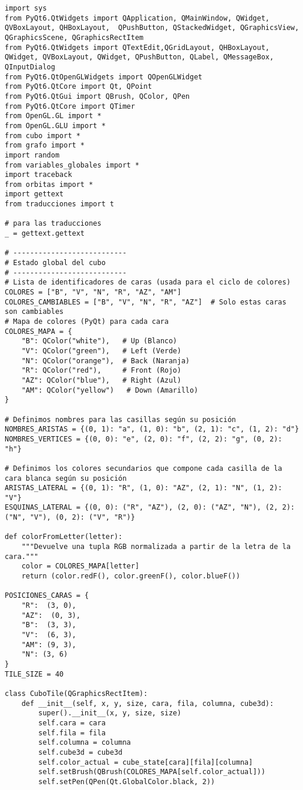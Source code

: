 \begin{lstlisting}
import sys
from PyQt6.QtWidgets import QApplication, QMainWindow, QWidget, QVBoxLayout, QHBoxLayout,  QPushButton, QStackedWidget, QGraphicsView, QGraphicsScene, QGraphicsRectItem
from PyQt6.QtWidgets import QTextEdit,QGridLayout, QHBoxLayout, QWidget, QVBoxLayout, QWidget, QPushButton, QLabel, QMessageBox, QInputDialog
from PyQt6.QtOpenGLWidgets import QOpenGLWidget
from PyQt6.QtCore import Qt, QPoint
from PyQt6.QtGui import QBrush, QColor, QPen
from PyQt6.QtCore import QTimer
from OpenGL.GL import *
from OpenGL.GLU import *
from cubo import *
from grafo import *
import random
from variables_globales import *
import traceback
from orbitas import *
import gettext
from traducciones import t

# para las traducciones
_ = gettext.gettext

# ---------------------------
# Estado global del cubo
# ---------------------------
# Lista de identificadores de caras (usada para el ciclo de colores)
COLORES = ["B", "V", "N", "R", "AZ", "AM"]
COLORES_CAMBIABLES = ["B", "V", "N", "R", "AZ"]  # Solo estas caras son cambiables
# Mapa de colores (PyQt) para cada cara
COLORES_MAPA = {
    "B": QColor("white"),   # Up (Blanco)
    "V": QColor("green"),   # Left (Verde)
    "N": QColor("orange"),  # Back (Naranja)
    "R": QColor("red"),     # Front (Rojo)
    "AZ": QColor("blue"),   # Right (Azul)
    "AM": QColor("yellow")   # Down (Amarillo)
}

# Definimos nombres para las casillas según su posición
NOMBRES_ARISTAS = {(0, 1): "a", (1, 0): "b", (2, 1): "c", (1, 2): "d"}
NOMBRES_VERTICES = {(0, 0): "e", (2, 0): "f", (2, 2): "g", (0, 2): "h"}

# Definimos los colores secundarios que compone cada casilla de la cara blanca según su posición
ARISTAS_LATERAL = {(0, 1): "R", (1, 0): "AZ", (2, 1): "N", (1, 2): "V"}
ESQUINAS_LATERAL = {(0, 0): ("R", "AZ"), (2, 0): ("AZ", "N"), (2, 2): ("N", "V"), (0, 2): ("V", "R")}

def colorFromLetter(letter):
    """Devuelve una tupla RGB normalizada a partir de la letra de la cara."""
    color = COLORES_MAPA[letter]
    return (color.redF(), color.greenF(), color.blueF())

POSICIONES_CARAS = {
    "R":  (3, 0),
    "AZ":  (0, 3),
    "B":  (3, 3),
    "V":  (6, 3),
    "AM": (9, 3),
    "N": (3, 6)
}
TILE_SIZE = 40

class CuboTile(QGraphicsRectItem):
    def __init__(self, x, y, size, cara, fila, columna, cube3d):
        super().__init__(x, y, size, size)
        self.cara = cara
        self.fila = fila
        self.columna = columna
        self.cube3d = cube3d
        self.color_actual = cube_state[cara][fila][columna]
        self.setBrush(QBrush(COLORES_MAPA[self.color_actual]))
        self.setPen(QPen(Qt.GlobalColor.black, 2))
       

\end{lstlisting}
